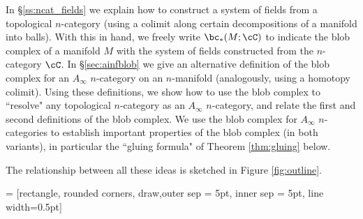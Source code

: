 In \S \ref{ss:ncat_fields}  we explain how to construct a system of fields from a topological $n$-category 
(using a colimit along certain decompositions of a manifold into balls). 
With this in hand, we freely write $\bc_*(M; \cC)$ to indicate the blob complex of a manifold $M$ 
with the system of fields constructed from the $n$-category $\cC$. 
In \S \ref{sec:ainfblob} we give an alternative definition 
of the blob complex for an $A_\infty$ $n$-category on an $n$-manifold (analogously, using a homotopy colimit).
Using these definitions, we show how to use the blob complex to ``resolve" any topological $n$-category as an 
$A_\infty$ $n$-category, and relate the first and second definitions of the blob complex.
We use the blob complex for $A_\infty$ $n$-categories to establish important properties of the blob complex (in both variants), 
in particular the ``gluing formula" of Theorem \ref{thm:gluing} below.

The relationship between all these ideas is sketched in Figure \ref{fig:outline}.

 = [rectangle, rounded corners, draw,outer sep = 5pt, inner sep = 5pt, line width=0.5pt]

